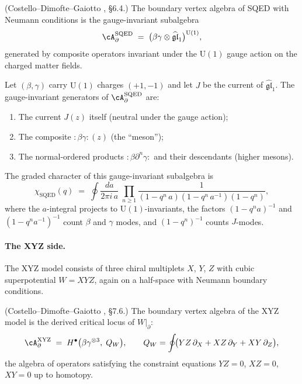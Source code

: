 \begin{proposition}
\label{prop:sqed-boundary-voa}
\textup{(Costello--Dimofte--Gaiotto \cite{CDG2023}, \S6.4.)}
The boundary vertex algebra of SQED with Neumann conditions is the
gauge-invariant subalgebra
\[
 \cA_{\partial}^{\mathrm{SQED}}
 \;=\;
 \bigl(\beta\gamma \otimes \widehat{\mathfrak{gl}}_1\bigr)^{\mathrm{U}(1)},
\]
generated by composite operators invariant under the $\mathrm{U}(1)$
gauge action on the charged matter fields.
\end{proposition}

\begin{example}
\label{ex:sqed-generators}
Let $(\beta,\gamma)$ carry $\mathrm{U}(1)$ charges $(+1,-1)$ and let
$J$ be the current of $\widehat{\mathfrak{gl}}_1$. The
gauge-invariant generators of
$\cA_\partial^{\mathrm{SQED}}$ are:
\begin{enumerate}[label=\textup{(\roman*)},nosep]
\item The current $J(z)$ itself (neutral under the gauge action);
\item The composite $:\!\beta\gamma\!:(z)$ (the ``meson'');
\item The normal-ordered products $:\!\beta\partial^n\gamma\!:$ and
 their descendants (higher mesons).
\end{enumerate}
The graded character of this gauge-invariant subalgebra is
\begin{equation}\label{eq:sqed-character}
\chi_{\mathrm{SQED}}(q)
\;=\;
\oint \frac{da}{2\pi i\,a}\;
\prod_{n \geq 1}
\frac{1}{(1 - q^n\,a)(1 - q^n\,a^{-1})(1 - q^n)},
\end{equation}
where the $a$-integral projects to $\mathrm{U}(1)$-invariants, the
factors $(1-q^n a)^{-1}$ and $(1-q^n a^{-1})^{-1}$ count $\beta$ and
$\gamma$ modes, and $(1-q^n)^{-1}$ counts $J$-modes.
\end{example}

\paragraph{The XYZ side.}
The XYZ model consists of three chiral multiplets $X$, $Y$, $Z$ with
cubic superpotential $W = XYZ$, again on a half-space with Neumann
boundary conditions.

\begin{proposition}
\label{prop:xyz-boundary-voa}
\textup{(Costello--Dimofte--Gaiotto \cite{CDG2023}, \S7.6.)}
The boundary vertex algebra of the XYZ model is the derived critical
locus of $W|_{\partial}$:
\[
 \cA_{\partial}^{\mathrm{XYZ}}
 \;=\;
 H^\bullet\bigl(\beta\gamma^{\otimes 3},\; Q_W\bigr),
 \qquad
 Q_W = \oint\!\bigl(Y Z\, \partial_X + X Z\, \partial_Y
 + X Y\, \partial_Z\bigr),
\]
the algebra of operators satisfying the constraint equations
$YZ = 0$, $XZ = 0$, $XY = 0$ up to homotopy.
\end{proposition}

